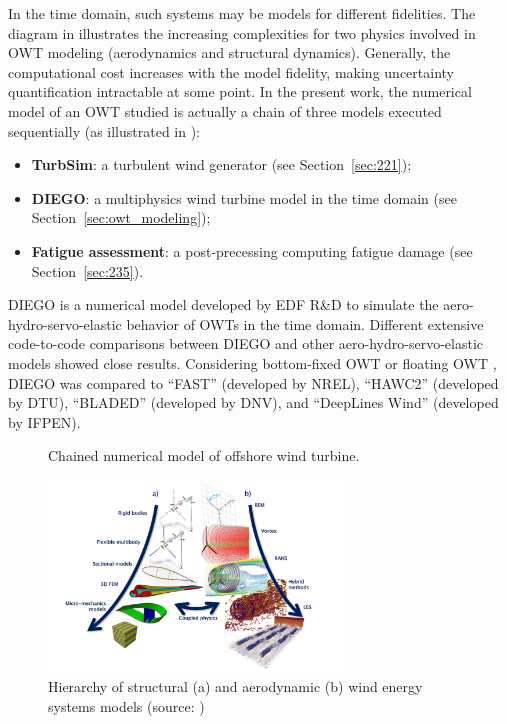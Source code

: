 In the time domain, such systems may be models for different fidelities. 
The diagram in  illustrates the increasing complexities for two physics involved in OWT modeling (aerodynamics and structural dynamics). 
Generally, the computational cost increases with the model fidelity, making uncertainty quantification intractable at some point. 
In the present work, the numerical model of an OWT studied is actually a chain of three models executed sequentially (as illustrated in ): 
\begin{itemize}
    \item \textbf{TurbSim}: a turbulent wind generator (see Section~\ref{sec:221});
    \item \textbf{DIEGO}: a multiphysics wind turbine model in the time domain (see Section~\ref{sec:owt_modeling}); 
    \item \textbf{Fatigue assessment}: a post-precessing computing fatigue damage (see Section~\ref{sec:235}). 
\end{itemize}
DIEGO is a numerical model developed by EDF R\&D to simulate the aero-hydro-servo-elastic behavior of OWTs in the time domain. 
Different extensive code-to-code comparisons between DIEGO and other aero-hydro-servo-elastic models showed close results. 
Considering bottom-fixed OWT \citep{popko_2021_DIEGO_benchmark} or floating OWT \citep{robertson_2020_diego_benchmark,kim_natarajan_2022}, DIEGO was compared to ``FAST'' (developed by NREL), ``HAWC2'' (developed by DTU), ``BLADED'' (developed by DNV), and ``DeepLines Wind'' (developed by IFPEN). 

\begin{figure}[h]
    \centering
    
    \caption{Chained numerical model of offshore wind turbine.}
    \label{fig:owt_chained_model}
\end{figure}


\begin{figure}
    \centering
    \includegraphics[width=0.7\textwidth]{./part1/figures/OWT_modeling_fidelities.png}
    \caption{Hierarchy of structural (a) and aerodynamic (b) wind energy systems models (source: \citealt{veers_2019_review})}
    \label{fig:owt_modeling_fidelities}
\end{figure}



